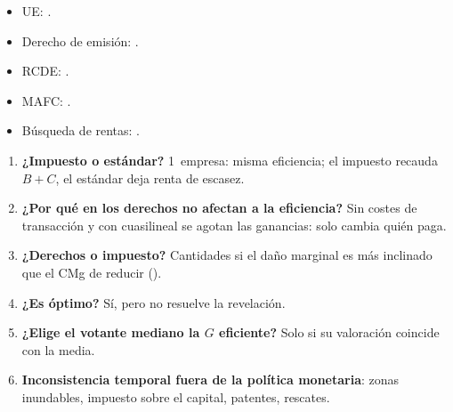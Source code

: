 \documentclass{article}
\begin{document}
\begin{columnas}
\anexorepaso
{}
\begin{itemize}
\item UE: .
\item Derecho de emisión: .
\item RCDE: .
\item MAFC: .
\item Búsqueda de rentas: .
\end{itemize}
\begin{enumerate}
\item \textbf{¿Impuesto o estándar?} 1~empresa: misma eficiencia; el impuesto recauda $B+C$, el estándar deja renta de escasez.
\item \textbf{¿Por qué en  los derechos no afectan a la eficiencia?} Sin costes de transacción y con cuasilineal se agotan las ganancias: solo cambia quién paga.
\item \textbf{¿Derechos o impuesto?} Cantidades si el daño marginal es más inclinado que el CMg de reducir ().
\item \textbf{¿Es  óptimo?} Sí, pero no resuelve la revelación.
\item \textbf{¿Elige el votante mediano la $G$ eficiente?} Solo si su valoración coincide con la media.
\item \textbf{Inconsistencia temporal fuera de la política monetaria}: zonas inundables, impuesto sobre el capital, patentes, rescates.
\end{enumerate}
\begin{trampa}

\end{trampa}
\end{columnas}
\end{document}
